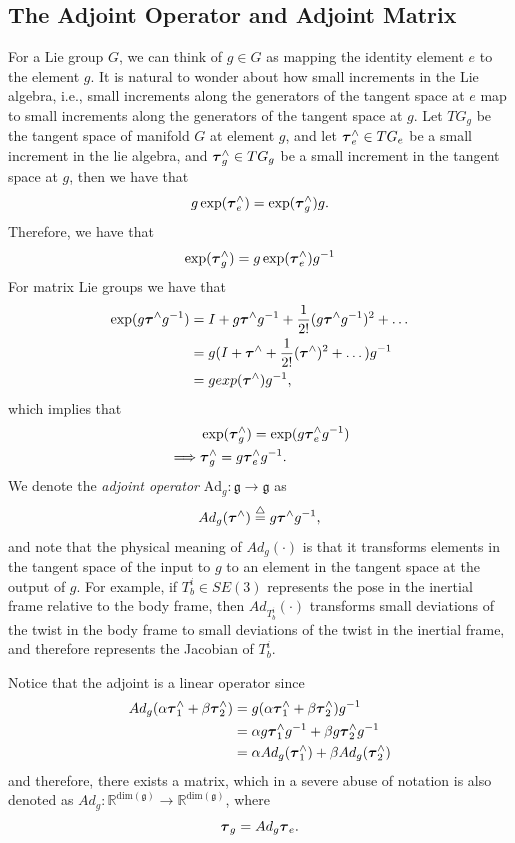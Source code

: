 \subsection{The Adjoint Operator and Adjoint Matrix}
For a Lie group $G$, we can think of $g\in G$ as mapping the identity element $e$ to the element $g$.  It is natural to wonder about how small increments in the Lie algebra, i.e., small increments along the generators of the tangent space at $e$ map to small increments along the generators of the tangent space at $g$. Let $TG_g$ be the tangent space of manifold $G$ at element $g$, and let $\boldsymbol{\tau}_e^\wedge\in TG_e$ be a small increment in the lie algebra, and $\boldsymbol{\tau}_g^\wedge\in TG_g$ be a small increment in the tangent space at $g$, then we have that
\[
g \exp(\boldsymbol{\tau}_e^\wedge) = \exp(\boldsymbol{\tau}_g^\wedge)g.
\]
Therefore, we have that
\[
\exp(\boldsymbol{\tau}_g^\wedge) = g \exp(\boldsymbol{\tau}_e^\wedge) g^{-1}
\]
For matrix Lie groups we have that
\begin{align*}
\exp(g \boldsymbol{\tau}^\wedge g^{-1}) 
	&= I + 	g \boldsymbol{\tau}^\wedge g^{-1} + \frac{1}{2!} (g \boldsymbol{\tau}^\wedge g^{-1})^2 + \dots \\
	&= g(I + 	\boldsymbol{\tau}^\wedge  + \frac{1}{2!} (\boldsymbol{\tau}^\wedge )^2 + \dots ) g^{-1} \\
	&= g exp(\boldsymbol{\tau}^\wedge) g^{-1},
\end{align*}
which implies that
\begin{align*}
& \exp(\boldsymbol{\tau}_g^\wedge) = \exp(g \boldsymbol{\tau}_e^\wedge g^{-1}) \\
\implies & \boldsymbol{\tau}_g^\wedge = g \boldsymbol{\tau}_e^\wedge g^{-1}.
\end{align*}
We denote the {\em adjoint operator} $\text{Ad}_g:\mathfrak{g}\to \mathfrak{g}$ as
\[
Ad_g(\boldsymbol{\tau}^\wedge) \stackrel{\triangle}{=} g \boldsymbol{\tau}^\wedge g^{-1},
\] 
and note that the physical meaning of $Ad_g(\cdot)$ is that it transforms elements in the tangent space of the input to $g$ to an element in the tangent space at the output of $g$.  For example, if $T_b^i\in SE(3)$ represents the pose in the inertial frame relative to the body frame, then $Ad_{T_b^i}(\cdot)$ transforms small deviations of the twist in the body frame to small deviations of the twist in the inertial frame, and therefore represents the Jacobian of $T_b^i$.

Notice that the adjoint is a linear operator since
\begin{align*}
Ad_g(\alpha \boldsymbol{\tau}_1^\wedge + \beta\boldsymbol{\tau}_2^\wedge) 
	&= g (\alpha \boldsymbol{\tau}_1^\wedge + \beta\boldsymbol{\tau}_2^\wedge)g^{-1} \\
	&= \alpha g\boldsymbol{\tau}_1^\wedge g^{-1} + \beta g\boldsymbol{\tau}_2^\wedge g^{-1} \\
	&= \alpha Ad_g(\boldsymbol{\tau}_1^\wedge) + \beta Ad_g(\boldsymbol{\tau}_2^\wedge)
\end{align*}
and therefore, there exists a matrix, which in a severe abuse of notation is also denoted as $Ad_g:\mathbb{R}^{\text{dim}(\mathfrak{g})} \to \mathbb{R}^{\text{dim}(\mathfrak{g})}$, where
\[
\boldsymbol{\tau}_g = Ad_g \boldsymbol{\tau}_e. 
\]

